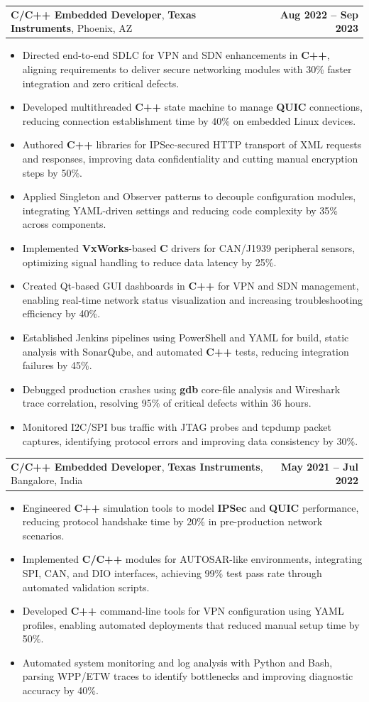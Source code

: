 \documentclass[letterpaper,11pt]{article}
\makeatletter
\newcommand{\resumeItem}[1]{
  \item\footnotesize{
    {#1 \vspace{-2pt}}
  }
}
\newcommand{\resumeSubheading}[4]{
  \vspace{-2pt}\item
    \begin{tabular*}{1.0\textwidth}[t]{l@{\extracolsep{\fill}}r}
      \textbf{\fontsize{10pt}{14pt}\selectfont #3}, \textbf{\fontsize{10pt}{14pt}\selectfont #1}, \fontsize{10pt}{14pt}\selectfont #4 & \textbf{\fontsize{10pt}{14pt}\selectfont #2} \\
    \end{tabular*}\vspace{-7pt}
}
\newcommand{\resumeItemListStart}{\begin{itemize}[leftmargin=*]}
\newcommand{\resumeItemListEnd}{\end{itemize}\vspace{-5pt}}
\makeatother
\begin{document}
    \resumeSubheading
        {Texas Instruments}{Aug 2022 -- Sep 2023}
        {C/C++ Embedded Developer}{Phoenix, AZ}
      \resumeItemListStart
        \resumeItem{Directed end-to-end SDLC for VPN and SDN enhancements in \textbf{C++}, aligning requirements to deliver secure networking modules with 30\% faster integration and zero critical defects.}
        \resumeItem{Developed multithreaded \textbf{C++} state machine to manage \textbf{QUIC} connections, reducing connection establishment time by 40\% on embedded Linux devices.}
        \resumeItem{Authored \textbf{C++} libraries for IPSec-secured HTTP transport of XML requests and responses, improving data confidentiality and cutting manual encryption steps by 50\%.}
        \resumeItem{Applied Singleton and Observer patterns to decouple configuration modules, integrating YAML-driven settings and reducing code complexity by 35\% across components.}
        \resumeItem{Implemented \textbf{VxWorks}-based \textbf{C} drivers for CAN/J1939 peripheral sensors, optimizing signal handling to reduce data latency by 25\%.}
        \resumeItem{Created Qt-based GUI dashboards in \textbf{C++} for VPN and SDN management, enabling real-time network status visualization and increasing troubleshooting efficiency by 40\%.}
        \resumeItem{Established Jenkins pipelines using PowerShell and YAML for build, static analysis with SonarQube, and automated \textbf{C++} tests, reducing integration failures by 45\%.}
        \resumeItem{Debugged production crashes using \textbf{gdb} core-file analysis and Wireshark trace correlation, resolving 95\% of critical defects within 36 hours.}
        \resumeItem{Monitored I2C/SPI bus traffic with JTAG probes and tcpdump packet captures, identifying protocol errors and improving data consistency by 30\%.}
      \resumeItemListEnd

    \resumeSubheading
        {Texas Instruments}{May 2021 -- Jul 2022}
        {C/C++ Embedded Developer}{Bangalore, India}
      \resumeItemListStart
        \resumeItem{Engineered \textbf{C++} simulation tools to model \textbf{IPSec} and \textbf{QUIC} performance, reducing protocol handshake time by 20\% in pre-production network scenarios.}
        \resumeItem{Implemented \textbf{C/C++} modules for AUTOSAR-like environments, integrating SPI, CAN, and DIO interfaces, achieving 99\% test pass rate through automated validation scripts.}
        \resumeItem{Developed \textbf{C++} command-line tools for VPN configuration using YAML profiles, enabling automated deployments that reduced manual setup time by 50\%.}
        \resumeItem{Automated system monitoring and log analysis with Python and Bash, parsing WPP/ETW traces to identify bottlenecks and improving diagnostic accuracy by 40\%.}
      \resumeItemListEnd
\end{document}
